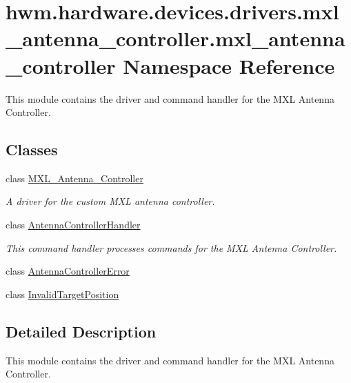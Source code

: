 \hypertarget{namespacehwm_1_1hardware_1_1devices_1_1drivers_1_1mxl__antenna__controller_1_1mxl__antenna__controller}{\section{hwm.\-hardware.\-devices.\-drivers.\-mxl\-\_\-antenna\-\_\-controller.\-mxl\-\_\-antenna\-\_\-controller Namespace Reference}
\label{namespacehwm_1_1hardware_1_1devices_1_1drivers_1_1mxl__antenna__controller_1_1mxl__antenna__controller}
}


This module contains the driver and command handler for the M\-X\-L Antenna Controller.  


\subsection*{Classes}
\begin{DoxyCompactItemize}
\item 
class \hyperlink{classhwm_1_1hardware_1_1devices_1_1drivers_1_1mxl__antenna__controller_1_1mxl__antenna__controll300dc396624a0e0bda412a3b1ecea20c}{M\-X\-L\-\_\-\-Antenna\-\_\-\-Controller}
\begin{DoxyCompactList}\small\item\em A driver for the custom M\-X\-L antenna controller. \end{DoxyCompactList}\item 
class \hyperlink{classhwm_1_1hardware_1_1devices_1_1drivers_1_1mxl__antenna__controller_1_1mxl__antenna__controll042461b90848f732dc4817f26065c532}{Antenna\-Controller\-Handler}
\begin{DoxyCompactList}\small\item\em This command handler processes commands for the M\-X\-L Antenna Controller. \end{DoxyCompactList}\item 
class \hyperlink{classhwm_1_1hardware_1_1devices_1_1drivers_1_1mxl__antenna__controller_1_1mxl__antenna__controller_1_1_antenna_controller_error}{Antenna\-Controller\-Error}
\item 
class \hyperlink{classhwm_1_1hardware_1_1devices_1_1drivers_1_1mxl__antenna__controller_1_1mxl__antenna__controller_1_1_invalid_target_position}{Invalid\-Target\-Position}
\end{DoxyCompactItemize}


\subsection{Detailed Description}
This module contains the driver and command handler for the M\-X\-L Antenna Controller. 